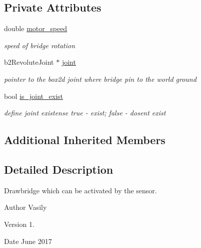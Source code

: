 \subsection*{Private Attributes}
\begin{DoxyCompactItemize}
\item 
\mbox{\label{class_revolute_bridge_a43f73302f3cf2296ef6693244af857c9}} 
double \hyperlink{class_revolute_bridge_a43f73302f3cf2296ef6693244af857c9}{motor\+\_\+speed}
\begin{DoxyCompactList}\small\item\em speed of bridge rotation \end{DoxyCompactList}\item 
\mbox{\label{class_revolute_bridge_a2a2330cd9538b2d2f049710494648de9}} 
b2\+Revolute\+Joint $\ast$ \hyperlink{class_revolute_bridge_a2a2330cd9538b2d2f049710494648de9}{joint}
\begin{DoxyCompactList}\small\item\em pointer to the box2d joint where bridge pin to the world ground \end{DoxyCompactList}\item 
\mbox{\label{class_revolute_bridge_a2acc242725606650e33a98f3d8f0b382}} 
bool \hyperlink{class_revolute_bridge_a2acc242725606650e33a98f3d8f0b382}{is\+\_\+joint\+\_\+exist}
\begin{DoxyCompactList}\small\item\em define joint existense \textquotesingle{}true\textquotesingle{} -\/ exist; \textquotesingle{}false\textquotesingle{} -\/ dosen\textquotesingle{}t exist \end{DoxyCompactList}\end{DoxyCompactItemize}
\subsection*{Additional Inherited Members}


\subsection{Detailed Description}
Drawbridge which can be activated by the sensor. 

\begin{DoxyAuthor}{Author}
Vasily 
\end{DoxyAuthor}
\begin{DoxyVersion}{Version}
1. 
\end{DoxyVersion}
\begin{DoxyDate}{Date}
June 2017 
\end{DoxyDate}



